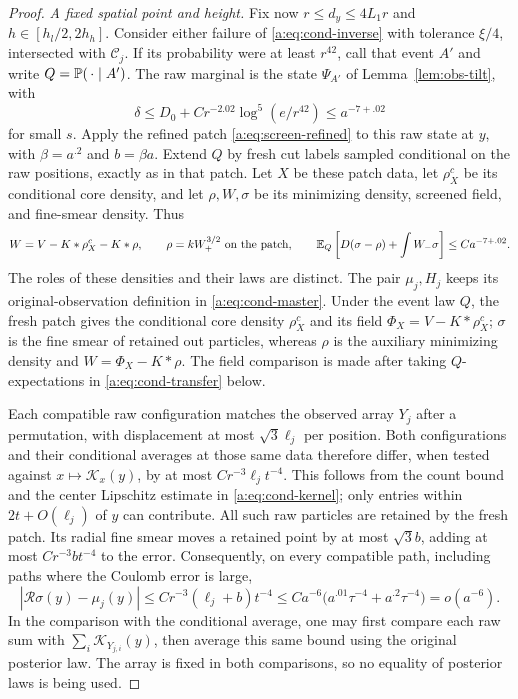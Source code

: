 \begin{proof}
\emph{A fixed spatial point and height.}
Fix now $r\le d_y\le4L_1r$ and
$h\in[h_l/2,2h_h]$. Consider either failure of
\eqref{a:eq:cond-inverse} with tolerance $\xi/4$, intersected with
$\mathcal C_j$. If its probability were at least $r^{42}$, call
that event $A'$ and write $Q=\mathbb P(\,\cdot\mid A')$.
The raw marginal is the state $\Psi_{A'}$ of
Lemma~\ref{lem:obs-tilt}, with
\begin{equation}\label{eq:obs-tilted-offset}
 \delta\le D_0+Cr^{-2.02}\log^5(e/r^{42})
                    \le a^{-7+.02}
\end{equation}
for small $s$. Apply the refined patch
\eqref{a:eq:screen-refined} to this raw state at $y$, with
$\beta=a^{.2}$ and $b=\beta a$. Extend $Q$ by fresh cut labels
sampled conditional on the raw positions, exactly as in that patch.
Let $X$ be these patch data, let $\rho_X^c$ be its conditional core
density, and let $\rho,W,\sigma$ be its minimizing density,
screened field, and fine-smear density. Thus
\[
 W=V-K*\rho_X^c-K*\rho,\qquad
 \rho=kW_+^{3/2}\ \hbox{on the patch},\qquad
 \mathbb E_Q\left[D(\sigma-\rho)+\int W_-\sigma\right]
       \le Ca^{-7+.02}.
\]
The roles of these densities and their laws are distinct. The pair
$\mu_j,H_j$ keeps its original-observation definition in
\eqref{a:eq:cond-master}. Under the event law $Q$, the fresh patch gives
the conditional core density $\rho_X^c$ and its field
$\Phi_X=V-K*\rho_X^c$; $\sigma$ is the fine smear of retained out
particles, whereas $\rho$ is the auxiliary minimizing density and
$W=\Phi_X-K*\rho$. The field comparison is made after taking
$Q$-expectations in \eqref{a:eq:cond-transfer} below.

Each compatible raw configuration matches the observed array
$Y_j$ after a permutation, with displacement at most
$\sqrt3\ell_j$ per position. Both configurations and their
conditional averages at those same data therefore differ, when
tested against $x\mapsto\mathcal K_x(y)$, by at most
$Cr^{-3}\ell_jt^{-4}$. This follows from the count bound and the
center Lipschitz estimate in \eqref{a:eq:cond-kernel}; only entries
within $2t+O(\ell_j)$ of $y$ can contribute. All such raw particles
are retained by the fresh patch. Its radial fine smear moves a
retained point by at most $\sqrt3b$, adding at most
$Cr^{-3}bt^{-4}$ to the error. Consequently, on every compatible
path, including paths where the Coulomb error is large,
\begin{equation}\label{a:eq:cond-matching}
 |\mathcal R\sigma(y)-\mu_j(y)|
   \le Cr^{-3}(\ell_j+b)t^{-4}
   \le Ca^{-6}\big(a^{.01}\tau^{-4}+a^{.2}\tau^{-4}\big)
   =o(a^{-6}).
\end{equation}
In the comparison with the conditional average, one may first
compare each raw sum with $\sum_i\mathcal K_{Y_{j,i}}(y)$, then
average this same bound using the original posterior law. The
array is fixed in both comparisons, so no equality of posterior
laws is being used.


\end{proof}
